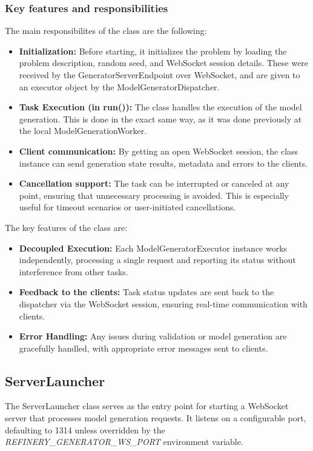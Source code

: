 		\subsubsection{Key features and responsibilities}
			The main responsibilites of the class are the following:
			\begin{itemize}
				\item \textbf{Initialization:} Before starting, it initializes the problem by loading the problem description, random seed, and WebSocket session details. These were
				received by the GeneratorServerEndpoint over WebSocket, and are given to an executor object by the ModelGeneratorDispatcher.
				\item \textbf{Task Execution (in run()):} The class handles the execution of the model generation. This is done in the exact same way, as it was done previously at the local ModelGenerationWorker.
				\item \textbf{Client communication:} By getting an open WebSocket session, the class instance can send generation state results, metadata and errors to the clients.
				\item \textbf{Cancellation support:} The task can be interrupted or canceled at any point, ensuring that unnecessary processing is avoided. This is especially useful for timeout scenarios or user-initiated cancellations.
			\end{itemize}
			The key features of the class are:
			\begin{itemize}
				\item \textbf{Decoupled Execution:} Each ModelGeneratorExecutor instance works independently, processing a single request and reporting its status without interference from other tasks.
				\item \textbf{Feedback to the clients:} Task status updates are sent back to the dispatcher via the WebSocket session, ensuring real-time communication with clients.
				\item \textbf{Error Handling:} Any issues during validation or model generation are gracefully handled, with appropriate error messages sent to clients.
			\end{itemize}

		\subsection{ServerLauncher}
		The ServerLauncher class serves as the entry point for starting a WebSocket server that 
		processes model generation requests. It listens on a configurable port, defaulting to 1314 
		unless overridden by the \textit{REFINERY\_GENERATOR\_WS\_PORT} environment variable. 
		
